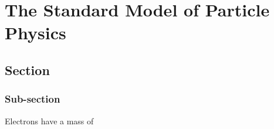 
\chapter{The Standard Model of Particle Physics}
\section{Section}
\subsection{Sub-section}
\cite{Stewart-Tackmann:2012}

\mll \dphill \mcatnlo \sherpa

Electrons have a mass of  
